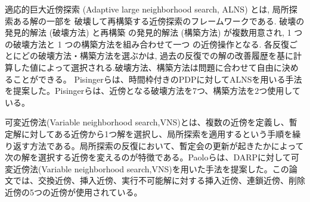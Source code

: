 適応的巨大近傍探索 (Adaptive large neighborhood search, ALNS) とは, 局所探索ある解の一部を 破壊して再構築する近傍探索のフレームワークである\cite{ALNS}. 破壊の発見的解法 (破壊方法) と再構築 の発見的解法 (構築方法) が複数用意され, 1 つの破壊方法と 1 つの構築方法を組み合わせて一つ の近傍操作となる. 各反復ごとにどの破壊方法・構築方法を選ぶかは, 過去の反復での解の改善履歴を基に計算した値によって選択される.破壊方法、構築方法は問題に合わせて自由に決めることができる。
Pisingerらは、時間枠付きのPDPに対してALNSを用いる手法を提案した\cite{pisinger}。Pisingerらは、近傍となる破壊方法を7つ、構築方法を2つ使用している。

可変近傍法(Variable neighborhood search,VNS)とは、複数の近傍を定義し、暫定解に対してある近傍から1つ解を選択し、局所探索を適用するという手順を繰り返す方法である。局所探索の反復において、暫定会の更新が起きたかによって次の解を選択する近傍を変えるのが特徴である。Paoloらは、DARPに対して可変近傍法(Variable neighborhood search,VNS)を用いた手法を提案した\cite{VNS}。この論文では、交換近傍、挿入近傍、実行不可能解に対する挿入近傍、連鎖近傍、削除近傍の5つの近傍が使用されている。
